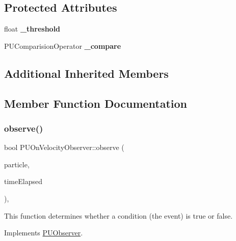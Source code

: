 \subsection*{Protected Attributes}
\begin{DoxyCompactItemize}
\item 
\mbox{\label{classPUOnVelocityObserver_a1a33a34f5819112c2f7c06150b81a6d4}} 
float {\bfseries \+\_\+threshold}
\item 
\mbox{\label{classPUOnVelocityObserver_a984a291ae34a1a2ed4f7a1619d38394f}} 
P\+U\+Comparision\+Operator {\bfseries \+\_\+compare}
\end{DoxyCompactItemize}
\subsection*{Additional Inherited Members}


\subsection{Member Function Documentation}
\mbox{\label{classPUOnVelocityObserver_a2719478a33935f6cafee11b72b1968bf}} 
\subsubsection{\texorpdfstring{observe()}{observe()}\hspace{0.1cm}{\footnotesize\ttfamily [1/2]}}
{\footnotesize\ttfamily bool P\+U\+On\+Velocity\+Observer\+::observe (\begin{DoxyParamCaption}\item[{\hyperlink{structPUParticle3D}{P\+U\+Particle3D} $\ast$}]{particle,  }\item[{float}]{time\+Elapsed }\end{DoxyParamCaption})\hspace{0.3cm}{\ttfamily [override]}, {\ttfamily [virtual]}}

This function determines whether a condition (the event) is true or false. 

Implements \hyperlink{classPUObserver_a50f59cc3245e291b641463db5d3037f7}{P\+U\+Observer}.

